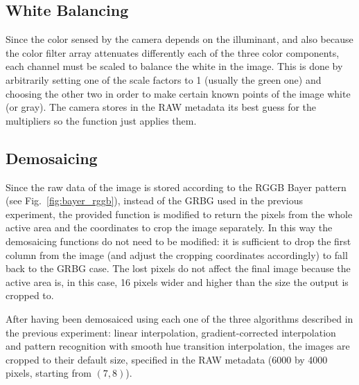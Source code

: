 \documentclass[a4paper,oneside]{article}
\begin{document}
\subsection{White Balancing}
Since the color sensed by the camera depends on the illuminant, and
also because the color filter array attenuates differently each of
the three color components, each channel must be scaled to balance the
white in the image.
%
This is done by arbitrarily setting one of the scale factors to 1
(usually the green one) and choosing the other two in order to make
certain known points of the image white (or gray). The camera stores
in the RAW metadata its best guess for the multipliers so the
 function just applies them.

\subsection{Demosaicing}
Since the raw data of the image is stored according to the RGGB Bayer
pattern (see Fig.~\ref{fig:bayer_rggb}), instead of the GRBG used in
the previous experiment, the provided  function
is modified to return the pixels from the whole active area and the
coordinates to crop the image separately. In this way the demosaicing
functions do not need to be modified: it is sufficient to drop the
first column from the image (and adjust the cropping coordinates
accordingly) to fall back to the GRBG case. The lost pixels do not
affect the final image because the active area is, in this case, 16
pixels wider and higher than the size the output is cropped to.

After having been demosaiced using each one of the three algorithms
described in the previous experiment: linear interpolation,
gradient-corrected interpolation and pattern recognition with smooth
hue transition interpolation, the images are cropped to their default
size, specified in the RAW metadata (6000 by 4000 pixels, starting
from $(7,8)$).
\end{document}
